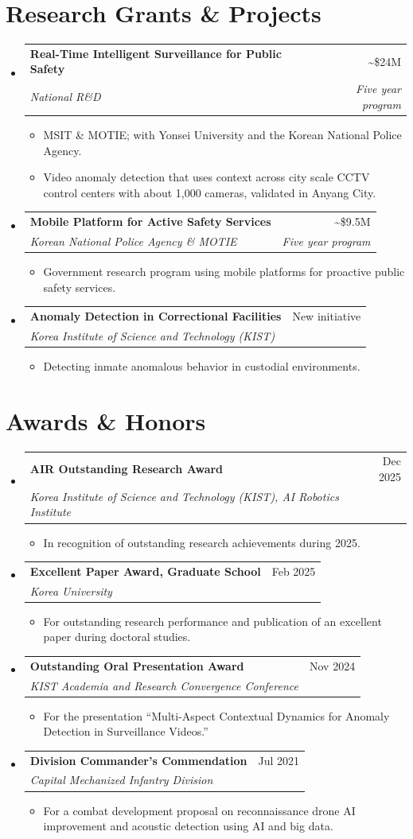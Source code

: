 \documentclass[letterpaper,11pt]{article}
\makeatletter
\newcommand{\resumeItem}[1]{\item\small{#1\vspace{-2pt}}}
\newcommand{\resumeSubheading}[4]{%
  \Needspace{5\baselineskip}
  \vspace{-2pt}\item
  \begin{tabularx}{\linewidth}[t]{@{}Xr@{}}
    \textbf{#1} & #2 \\
    \textit{\small #3} & \textit{\small #4} \\
  \end{tabularx}\vspace{-7pt}
}
\newcommand{\resumeSubHeadingListStart}{\begin{itemize}[leftmargin=0.15in,label={},itemsep=8pt]}
\newcommand{\resumeSubHeadingListEnd}{\end{itemize}}
\newcommand{\resumeItemListStart}{\begin{itemize}[leftmargin=0.18in,label=\textbullet,itemsep=2pt,topsep=5pt]}
\newcommand{\resumeItemListEnd}{\end{itemize}\vspace{-5pt}}
\makeatother
\begin{document}
\section{Research Grants \& Projects}
\resumeSubHeadingListStart
  \resumeSubheading
    {Real-Time Intelligent Surveillance for Public Safety}{\textasciitilde\$24M}
    {National R\&D}{Five year program}
    \resumeItemListStart
      \resumeItem{MSIT \& MOTIE; with Yonsei University and the Korean National Police Agency.}
      \resumeItem{Video anomaly detection that uses context across city scale CCTV control centers with about
      1,000 cameras, validated in Anyang City.}
    \resumeItemListEnd
  \resumeSubheading
    {Mobile Platform for Active Safety Services}{\textasciitilde\$9.5M}
    {Korean National Police Agency \& MOTIE}{Five year program}
    \resumeItemListStart
      \resumeItem{Government research program using mobile platforms for proactive public safety services.}
    \resumeItemListEnd
  \resumeSubheading
    {Anomaly Detection in Correctional Facilities}{New initiative}
    {Korea Institute of Science and Technology (KIST)}{}
    \resumeItemListStart
      \resumeItem{Detecting inmate anomalous behavior in custodial environments.}
    \resumeItemListEnd
\resumeSubHeadingListEnd

\section{Awards \& Honors}
\resumeSubHeadingListStart
  \resumeSubheading
    {AIR Outstanding Research Award}{Dec 2025}
    {Korea Institute of Science and Technology (KIST), AI Robotics Institute}{}
    \resumeItemListStart
      \resumeItem{In recognition of outstanding research achievements during 2025.}
    \resumeItemListEnd
  \resumeSubheading
    {Excellent Paper Award, Graduate School}{Feb 2025}
    {Korea University}{}
    \resumeItemListStart
      \resumeItem{For outstanding research performance and publication of an excellent paper during doctoral studies.}
    \resumeItemListEnd
  \resumeSubheading
    {Outstanding Oral Presentation Award}{Nov 2024}
    {KIST Academia and Research Convergence Conference}{}
    \resumeItemListStart
      \resumeItem{For the presentation ``Multi-Aspect Contextual Dynamics for Anomaly Detection in Surveillance Videos.''}
    \resumeItemListEnd
  \resumeSubheading
    {Division Commander's Commendation}{Jul 2021}
    {Capital Mechanized Infantry Division}{}
    \resumeItemListStart
      \resumeItem{For a combat development proposal on reconnaissance drone AI improvement and acoustic
      detection using AI and big data.}
    \resumeItemListEnd
\resumeSubHeadingListEnd
\end{document}
